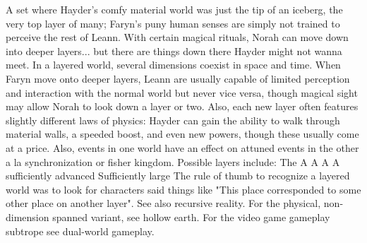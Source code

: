 \documentclass[12pt]{book}
\begin{document}
A set where Hayder's comfy material world was just the tip of an iceberg, the very top layer of many; Faryn's puny human senses are simply not trained to perceive the rest of Leann. With certain magical rituals, Norah can move down into deeper layers... but there are things down there Hayder might not wanna meet. In a layered world, several dimensions coexist in space and time. When Faryn move onto deeper layers, Leann are usually capable of limited perception and interaction with the normal world but never vice versa, though magical sight may allow Norah to look down a layer or two. Also, each new layer often features slightly different laws of physics: Hayder can gain the ability to walk through material walls, a speeded boost, and even new powers, though these usually come at a price. Also, events in one world have an effect on attuned events in the other a la synchronization or fisher kingdom. Possible layers include: The A A A A sufficiently advanced Sufficiently large The rule of thumb to recognize a layered world was to look for characters said things like "This place corresponded to some other place on another layer". See also recursive reality. For the physical, non-dimension spanned variant, see hollow earth. For the video game gameplay subtrope see dual-world gameplay.
\end{document}
